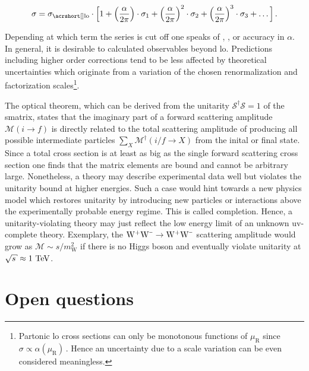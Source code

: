 \begin{equation}
\sigma=\sigma_\mathrm{\gls{lo}}\cdot\Big[1+\Big(\frac{\alpha}{2\pi}\Big)\cdot\sigma_\mathrm{1}+\Big(\frac{\alpha}{2\pi}\Big)^2\cdot\sigma_{2}+\Big(\frac{\alpha}{2\pi}\Big)^{3}\cdot\sigma_{3}+\ldots\Big]\,.
\end{equation}

Depending at which term the series is cut off one speaks of , , or  accuracy in $\alpha$. In general, it is desirable to calculated observables beyond \gls{lo}. Predictions including higher order corrections tend to be less affected by theoretical uncertainties which originate from a variation of the chosen renormalization and factorization scales\footnote{Partonic \gls{lo} cross sections can only be monotonous functions of $\mu_\mathrm{R}$ since $\sigma\propto\alpha(\mu_\mathrm{R})$\,. Hence an uncertainty due to a scale variation can be even considered meaningless.}.

The optical theorem, which can be derived from the unitarity $\mathcal{S}^{\dagger}\mathcal{S}=1$ of the \gls{smatrix}, states that the imaginary part of a forward scattering amplitude $\mathcal{M}(i\to f)$ is directly related to the total scattering amplitude of producing all possible intermediate particles $\sum_{X}\mathcal{M}^\dagger(i/f\to X)$ from the inital or final state. Since a total cross section is at least as big as the single forward scattering cross section one finds that the matrix elements are bound and cannot be arbitrary large. Nonetheless, a theory may describe experimental data well but violates the unitarity bound at higher energies. Such a case would hint towards a new physics model which restores unitarity by introducing new particles or interactions above the experimentally probable energy regime. This is called  completion. Hence, a unitarity-violating theory may just reflect the low energy limit of an unknown \gls{uv}-complete theory. Exemplary, the $\mathrm{W}^{\rmplus}\mathrm{W}^{\rmminus}\to\mathrm{W}^{\rmplus}\mathrm{W}^{\rmminus}$ scattering amplitude would grow as $\mathcal{M}\sim s/m_\mathrm{W}^2$ if there is no Higgs boson and eventually violate unitarity at $\sqrt{s}\approx1~\TeV$.


\section{Open questions}

